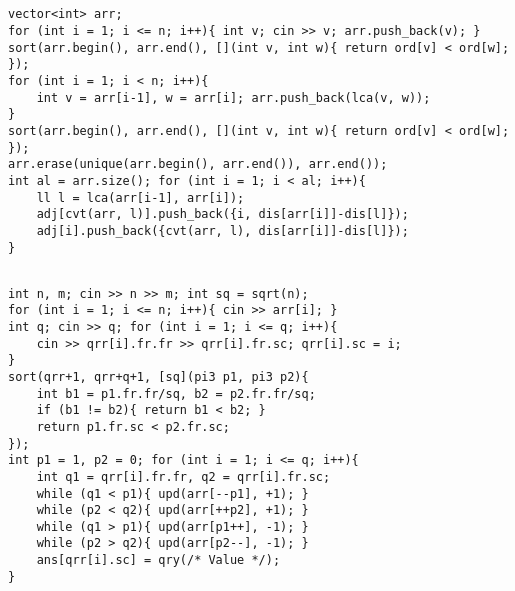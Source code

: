 \documentclass[landscape, 8pt, a4paper, oneside, twocolumn]{extarticle}
\begin{document}
\subsection{}
\begin{verbatim}
vector<int> arr;
for (int i = 1; i <= n; i++){ int v; cin >> v; arr.push_back(v); }
sort(arr.begin(), arr.end(), [](int v, int w){ return ord[v] < ord[w]; });
for (int i = 1; i < n; i++){
    int v = arr[i-1], w = arr[i]; arr.push_back(lca(v, w));
}
sort(arr.begin(), arr.end(), [](int v, int w){ return ord[v] < ord[w]; });
arr.erase(unique(arr.begin(), arr.end()), arr.end());
int al = arr.size(); for (int i = 1; i < al; i++){
    ll l = lca(arr[i-1], arr[i]);
    adj[cvt(arr, l)].push_back({i, dis[arr[i]]-dis[l]});
    adj[i].push_back({cvt(arr, l), dis[arr[i]]-dis[l]});
}
\end{verbatim}
\subsection{}
\begin{verbatim}
int n, m; cin >> n >> m; int sq = sqrt(n);
for (int i = 1; i <= n; i++){ cin >> arr[i]; }
int q; cin >> q; for (int i = 1; i <= q; i++){
    cin >> qrr[i].fr.fr >> qrr[i].fr.sc; qrr[i].sc = i;
}
sort(qrr+1, qrr+q+1, [sq](pi3 p1, pi3 p2){
    int b1 = p1.fr.fr/sq, b2 = p2.fr.fr/sq;
    if (b1 != b2){ return b1 < b2; }
    return p1.fr.sc < p2.fr.sc;
});
int p1 = 1, p2 = 0; for (int i = 1; i <= q; i++){
    int q1 = qrr[i].fr.fr, q2 = qrr[i].fr.sc;
    while (q1 < p1){ upd(arr[--p1], +1); }
    while (p2 < q2){ upd(arr[++p2], +1); }
    while (q1 > p1){ upd(arr[p1++], -1); }
    while (p2 > q2){ upd(arr[p2--], -1); }
    ans[qrr[i].sc] = qry(/* Value */);
}
\end{verbatim}
\end{document}
